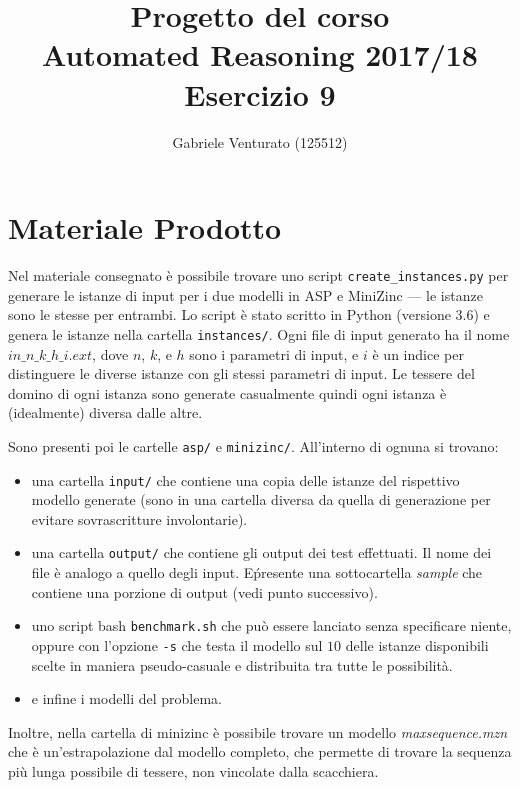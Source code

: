 \documentclass[12pt,a4paper,english,italian]{article}
\title{Progetto del corso \\Automated Reasoning 2017/18\\Esercizio 9}
\author{Gabriele Venturato (125512)}
\begin{document}
\maketitle

\begin{abstract}

\end{abstract}

\section{Materiale Prodotto}
Nel materiale consegnato è possibile trovare uno script \texttt{create\_instances.py} per generare le istanze di input per i due modelli in ASP e MiniZinc --- le istanze sono le stesse per entrambi. Lo script è stato scritto in Python (versione 3.6) e genera le istanze nella cartella \texttt{instances/}. Ogni file di input generato ha il nome $in\_n\_k\_h\_i.ext$, dove $n$, $k$, e $h$ sono i parametri di input, e $i$ è un indice per distinguere le diverse istanze con gli stessi parametri di input. Le tessere del domino di ogni istanza sono generate casualmente quindi ogni istanza è (idealmente) diversa dalle altre.

Sono presenti poi le cartelle \texttt{asp/} e \texttt{minizinc/}. All'interno di ognuna si trovano:
\begin{itemize}
	\item una cartella \texttt{input/} che contiene una copia delle istanze del rispettivo modello generate (sono in una cartella diversa da quella di generazione per evitare sovrascritture involontarie).
	\item una cartella \texttt{output/} che contiene gli output dei test effettuati. Il nome dei file è analogo a quello degli input. E\' presente una sottocartella \emph{sample} che contiene una porzione di output (vedi punto successivo).
	\item uno script bash \texttt{benchmark.sh} che può essere lanciato senza specificare niente, oppure con l'opzione \texttt{-s} che testa il modello sul $10$ delle istanze disponibili scelte in maniera pseudo-casuale e distribuita tra tutte le possibilità.
	\item e infine i modelli del problema.
\end{itemize}

Inoltre, nella cartella di minizinc è possibile trovare un modello \emph{maxsequence.mzn} che è un'estrapolazione dal modello completo, che permette di trovare la sequenza più lunga possibile di tessere, non vincolate dalla scacchiera.
\end{document}
